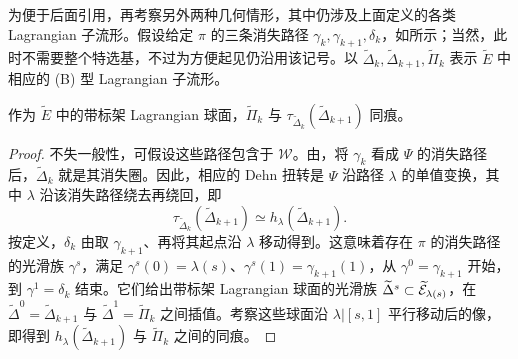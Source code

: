 为便于后面引用，再考察另外两种几何情形，其中仍涉及上面定义的各类 Lagrangian 子流形。假设给定 $\pi$ 的三条消失路径 $\gamma_k,\gamma_{k+1},\delta_k$，如所示；当然，此时不需要整个特选基，不过为方便起见仍沿用该记号。以 $\widetilde\Delta_k,\widetilde\Delta_{k+1},\widetilde\Pi_k$ 表示 $\widetilde E$ 中相应的 (B) 型 Lagrangian 子流形。
\begin{lemma}\label{st:18.3}
作为 $\widetilde E$ 中的带标架 Lagrangian 球面，$\widetilde\Pi_k$ 与 $\tau_{\widetilde\Delta_k}(\widetilde\Delta_{k+1})$ 同痕。
\end{lemma}
\begin{proof}
不失一般性，可假设这些路径包含于 $\mathcal W$。由，将 $\gamma_k$ 看成 $\Psi$ 的消失路径后，$\widetilde\Delta_k$ 就是其消失圈。因此，相应的 Dehn 扭转是 $\Psi$ 沿路径 $\lambda$ 的单值变换，其中 $\lambda$ 沿该消失路径绕去再绕回，即
\[
\tau_{\widetilde\Delta_k}(\widetilde\Delta_{k+1})\simeq h_\lambda(\widetilde\Delta_{k+1}).
\]
按定义，$\delta_k$ 由取 $\gamma_{k+1}$、再将其起点沿 $\lambda$ 移动得到。这意味着存在 $\pi$ 的消失路径的光滑族 $\gamma^s$，满足 $\gamma^s(0)=\lambda(s)$、$\gamma^s(1)=\gamma_{k+1}(1)$，从 $\gamma^0=\gamma_{k+1}$ 开始，到 $\gamma^1=\delta_k$ 结束。它们给出带标架 Lagrangian 球面的光滑族 $\widetilde\Delta^s\subset\widetilde{\mathcal E}_{\lambda(s)}$，在 $\widetilde\Delta^0=\widetilde\Delta_{k+1}$ 与 $\widetilde\Delta^1=\widetilde\Pi_k$ 之间插值。考察这些球面沿 $\lambda|[s,1]$ 平行移动后的像，即得到 $h_\lambda(\widetilde\Delta_{k+1})$ 与 $\widetilde\Pi_k$ 之间的同痕。
\end{proof}

